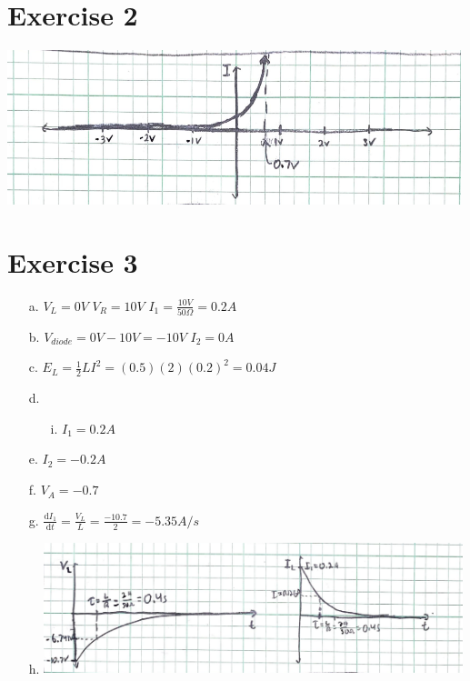\documentclass[12pt]{article}
\begin{document}
\section*{Exercise 2}
\includegraphics[width=5.2in]{2.png}

\section*{Exercise 3}
\begin{enumerate}
    \item[a.]
    $V_L = 0V$
    $V_R = 10V$
    $I_1 = \frac{10V}{50\Omega} = 0.2A$

    \item[b.]
    $V_{diode} = 0V - 10V = -10V$
    $I_2 = 0A$

    \item[c.]
    $E_L = \frac{1}{2} L I^2 = (0.5)(2)(0.2)^2 = 0.04 J$

    \item[d.]
    \begin{enumerate}
        \item[i.] 
        $I_1 = 0.2 A$
    \end{enumerate}
    \item[e.]
    $I_2 = -0.2 A$

    \item[f.]
    $V_A = -0.7$

    \item[g.]
    $\frac{\mathrm{d} I_1}{\mathrm{d} t} = \frac{V_L}{L} = \frac{-10.7}{2} = -5.35 A/s$

    \item[h.]
    \includegraphics[width=4.8in]{3h.png}

\end{enumerate}
\end{document}
